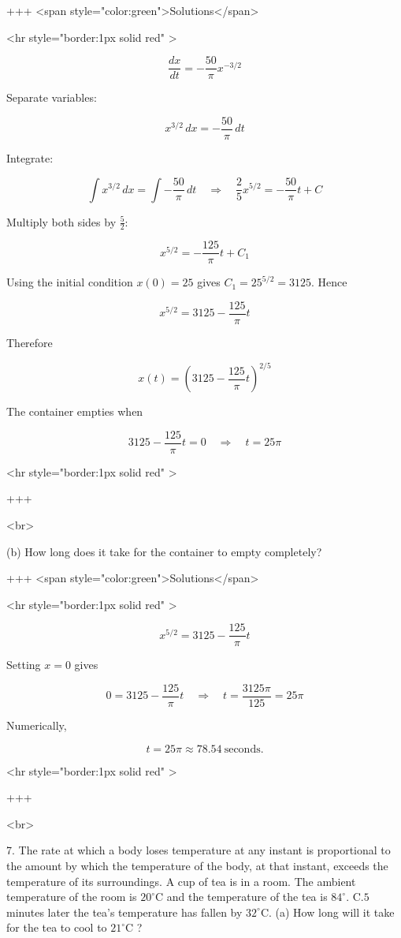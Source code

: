 +++ <span style="color:green">Solutions</span>

<hr style="border:1px solid red" >

$$
\frac{dx}{dt} = -\frac{50}{\pi} x^{-3/2}
$$


Separate variables:

$$
x^{3/2}\,dx = -\frac{50}{\pi}\,dt
$$


Integrate:

$$
\int x^{3/2}\,dx = \int -\frac{50}{\pi}\,dt
\quad\Longrightarrow\quad
\frac{2}{5}x^{5/2} = -\frac{50}{\pi}t + C
$$


Multiply both sides by $\tfrac{5}{2}$:

$$
x^{5/2} = -\frac{125}{\pi}t + C_1
$$


Using the initial condition $x(0)=25$ gives $C_1 = 25^{5/2}=3125$. Hence

$$
x^{5/2} = 3125 - \frac{125}{\pi}t
$$


Therefore

$$
x(t)=\left(3125-\frac{125}{\pi}t\right)^{2/5}
$$


The container empties when

$$
3125-\frac{125}{\pi}t=0 \quad\Longrightarrow\quad t=25\pi
$$

<hr style="border:1px solid red" >

+++

<br>

(b) How long does it take for the container to empty completely?


+++ <span style="color:green">Solutions</span>

<hr style="border:1px solid red" >

$$
x^{5/2}=3125-\frac{125}{\pi}t
$$


Setting $x=0$ gives

$$
0=3125-\frac{125}{\pi}t
\quad\Longrightarrow\quad
t=\frac{3125\pi}{125}=25\pi
$$


Numerically,

$$
t=25\pi\approx 78.54\ \text{seconds}.
$$

<hr style="border:1px solid red" >

+++

<br>

7. The rate at which a body loses temperature at any instant is proportional to the amount by which the temperature of the body, at that instant, exceeds the temperature of its surroundings.
A cup of tea is in a room. The ambient temperature of the room is $20^{\circ} \mathrm{C}$ and the temperature of the tea is $84^{\circ}$. $\mathrm{C} .5$ minutes later the tea's temperature has fallen by $32^{\circ} \mathrm{C}$.
(a) How long will it take for the tea to cool to $21^{\circ} \mathrm{C}$ ?

